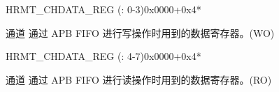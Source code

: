 \begin{register}{H}{RMT\_CHDATA\_REG (: 0-3)}{0x0000+0x4*}\label{regdesc:RMTCHNDATAREG}
%
\regnewline%
\begin{regdesc}\begin{reglist}
\label{fielddesc:RMTCHNDATA}\item [RMT\_CH\regindex{n}DATA] 通道  通过 APB FIFO 进行写操作时用到的数据寄存器。(WO)
\end{reglist}\end{regdesc}
\end{register}


\begin{register}{H}{RMT\_CHDATA\_REG (: 4-7)}{0x0000+0x4*}\label{regdesc:RMTCHMDATAREG}
%
\regnewline%
\begin{regdesc}\begin{reglist}
\label{fielddesc:RMTCHMDATA}\item [RMT\_CH\regindex{m}DATA] 通道  通过 APB FIFO 进行读操作时用到的数据寄存器。(RO)
\end{reglist}\end{regdesc}
\end{register}


